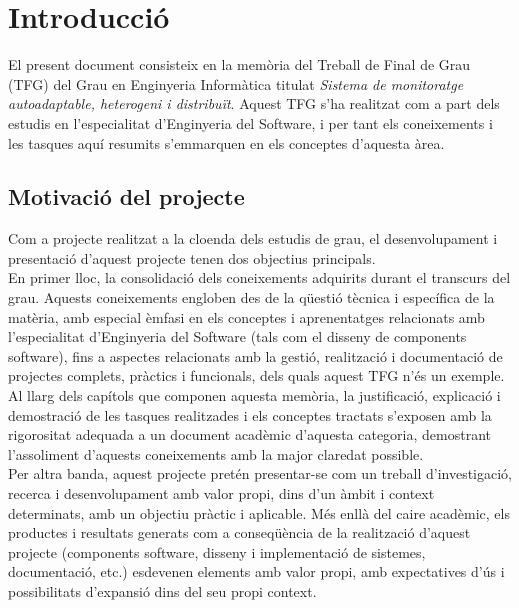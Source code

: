 
\chapter{Introducció} %

\label{Introduccio} %

El present document consisteix en la memòria del Treball de Final de Grau (TFG) del Grau en Enginyeria Informàtica titulat \textit{Sistema de monitoratge autoadaptable, heterogeni i distribuït}. Aquest TFG s'ha realitzat com a part dels estudis en l'especialitat d'Enginyeria del Software, i per tant els coneixements i les tasques aquí resumits s'emmarquen en els conceptes d'aquesta àrea.

\section{Motivació del projecte}

Com a projecte realitzat a la cloenda dels estudis de grau, el desenvolupament i presentació d'aquest projecte tenen dos objectius principals.\\

En primer lloc, la consolidació dels coneixements adquirits durant el transcurs del grau. Aquests coneixements engloben des de la qüestió tècnica i específica de la matèria, amb especial èmfasi en els conceptes i aprenentatges relacionats amb l'especialitat d'Enginyeria del Software (tals com el disseny de components software), fins a aspectes relacionats amb la gestió, realització i documentació de projectes complets, pràctics i funcionals, dels quals aquest TFG n'és un exemple. Al llarg dels capítols que componen aquesta memòria, la justificació, explicació i demostració de les tasques realitzades i els conceptes tractats s'exposen amb la rigorositat adequada a un document acadèmic d'aquesta categoria, demostrant l'assoliment d'aquests coneixements amb la major claredat possible.\\

Per altra banda, aquest projecte pretén presentar-se com un treball d'investigació, recerca i desenvolupament amb valor propi, dins d'un àmbit i context determinats, amb un objectiu pràctic i aplicable. Més enllà del caire acadèmic, els productes i resultats generats com a conseqüència de la realització d'aquest projecte (components software, disseny i implementació de sistemes, documentació, etc.) esdevenen elements amb valor propi, amb expectatives d'ús  i possibilitats d'expansió dins del seu propi context.\\

